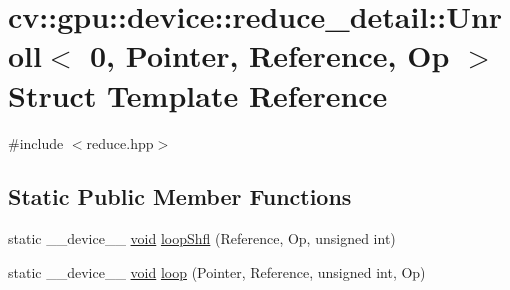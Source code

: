 \hypertarget{structcv_1_1gpu_1_1device_1_1reduce__detail_1_1Unroll_3_010_00_01Pointer_00_01Reference_00_01Op_01_4}{\section{cv\-:\-:gpu\-:\-:device\-:\-:reduce\-\_\-detail\-:\-:Unroll$<$ 0, Pointer, Reference, Op $>$ Struct Template Reference}
\label{structcv_1_1gpu_1_1device_1_1reduce__detail_1_1Unroll_3_010_00_01Pointer_00_01Reference_00_01Op_01_4}
}


{\ttfamily \#include $<$reduce.\-hpp$>$}

\subsection*{Static Public Member Functions}
\begin{DoxyCompactItemize}
\item 
static \-\_\-\-\_\-device\-\_\-\-\_\- \hyperlink{legacy_8hpp_a8bb47f092d473522721002c86c13b94e}{void} \hyperlink{structcv_1_1gpu_1_1device_1_1reduce__detail_1_1Unroll_3_010_00_01Pointer_00_01Reference_00_01Op_01_4_a1ca97e3e5b321651b9d5ca401421dcdd}{loop\-Shfl} (Reference, Op, unsigned int)
\item 
static \-\_\-\-\_\-device\-\_\-\-\_\- \hyperlink{legacy_8hpp_a8bb47f092d473522721002c86c13b94e}{void} \hyperlink{structcv_1_1gpu_1_1device_1_1reduce__detail_1_1Unroll_3_010_00_01Pointer_00_01Reference_00_01Op_01_4_ac4586947379b5ead7043193dc8f6e8e1}{loop} (Pointer, Reference, unsigned int, Op)
\end{DoxyCompactItemize}



